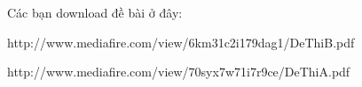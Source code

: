 Các bạn download đề bài ở đây:  

   http://www.mediafire.com/view/6km31c2i179dag1/DeThiB.pdf  

   http://www.mediafire.com/view/70syx7w71i7r9ce/DeThiA.pdf  

\